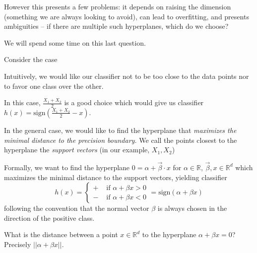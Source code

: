 \documentclass[12pt]{report}
\newcommand{\R}{\mathbb{R}}
\newcommand{\norm}[1]{\left\vert\left\vert #1 \right\vert\right\vert}
\begin{document}
However this presents a few problems: it depends on raising the dimension (something we are always looking to avoid), can lead to overfitting, and presents ambiguities -- if there are multiple such hyperplanes, which do we choose?

We will spend some time on this last question.

Consider the case

\begin{center}
\end{center}

Intuitively, we would like our classifier not to be too close to the data points nor to favor one class over the other.

In this case, $\frac{X_1 + X_2}{2}$ is a good choice which would give us classifier $h(x) = \text{sign}(\frac{X_1 + X_2}{2} - x)$.

In the general case, we would like to find the hyperplane that \emph{maximizes the minimal distance to the precision boundary.} We call the points closest to the hyperplane the \emph{support vectors} (in our example, $X_1, X_2$)

Formally, we want to find the hyperplane $0 = \alpha + \vec \beta \cdot x$ for $\alpha \in \R$, $\vec \beta, x \in \R^d$ which maximizes the minimal distance to the support vectors, yielding classifier
\[h(x) = \begin{cases}
        + & \text{ if } \alpha + \beta x > 0 \\
        - & \text{ if } \alpha + \beta x < 0
    \end{cases} = \text{sign}(\alpha + \beta x)\]
following the convention that the normal vector $\beta$ is always chosen in the direction of the positive class.

What is the distance between a point $x \in \R^d$ to the hyperplane $\alpha + \beta x = 0$? Precisely $\norm{\alpha + \beta x}$.
\end{document}
